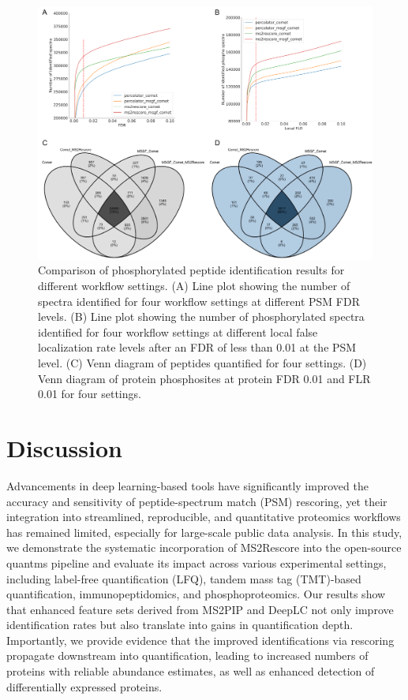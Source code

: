 \documentclass[12pt]{article}
\begin{document}
\begin{figure}[ht!]
	\centering
	\includegraphics[width=1\textwidth]{figures//phospho2.png}
	\caption{Comparison of phosphorylated peptide identification results for different workflow settings. (A) Line plot showing the number of spectra identified for four workflow settings at different PSM FDR levels. (B) Line plot showing the number of phosphorylated spectra identified for four workflow settings at different local false localization rate levels after an FDR of less than 0.01 at the PSM level. (C) Venn diagram of peptides quantified for four settings. (D) Venn diagram of protein phosphosites at protein FDR 0.01 and FLR 0.01 for four settings.}
	\label{fig:PXD026824_ms2rescore}
\end{figure}

\section{Discussion}
Advancements in deep learning-based tools have significantly improved the accuracy and sensitivity of peptide-spectrum match (PSM) rescoring, yet their integration into streamlined, reproducible, and quantitative proteomics workflows has remained limited, especially for large-scale public data analysis. In this study, we demonstrate the systematic incorporation of MS2Rescore into the open-source quantms pipeline and evaluate its impact across various experimental settings, including label-free quantification (LFQ), tandem mass tag (TMT)-based quantification, immunopeptidomics, and phosphoproteomics. Our results show that enhanced feature sets derived from MS2PIP and DeepLC not only improve identification rates but also translate into gains in quantification depth. Importantly, we provide evidence that the improved identifications via rescoring propagate downstream into quantification, leading to increased numbers of proteins with reliable abundance estimates, as well as enhanced detection of differentially expressed proteins.
\end{document}
